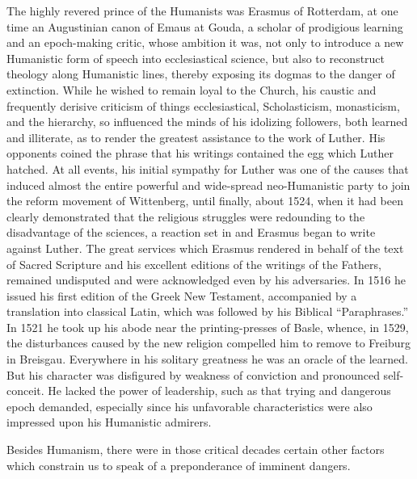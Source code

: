 The highly revered prince of the Humanists was Erasmus of
Rotterdam, at one time an Augustinian canon of Emaus at Gouda,
a scholar of prodigious learning and an epoch-making critic, whose
ambition it was, not only to introduce a new Humanistic form of
speech into ecclesiastical science, but also to reconstruct theology
along Humanistic lines, thereby exposing its dogmas to the danger
of extinction. While he wished to remain loyal to the Church, his
caustic and frequently derisive criticism of things ecclesiastical, Scholasticism,
monasticism, and the hierarchy, so influenced the minds
of his idolizing followers, both learned and illiterate, as to render
the greatest assistance to the work of Luther. His opponents coined
the phrase that his writings contained the egg which Luther hatched.
At all events, his initial sympathy for Luther was one of the causes
that induced almost the entire powerful and wide-spread neo-Humanistic
party to join the reform movement of Wittenberg, until
finally, about 1524, when it had been clearly demonstrated that the
religious struggles were redounding to the disadvantage of the sciences,
a reaction set in and Erasmus began to write against Luther.
The great services which Erasmus rendered in behalf of the text
of Sacred Scripture and his excellent editions of the writings of the
Fathers, remained undisputed and were acknowledged even by his
adversaries. In 1516 he issued his first edition of the Greek New
Testament, accompanied by a translation into classical Latin, which
was followed by his Biblical “Paraphrases.” In 1521 he took up his
abode near the printing-presses of Basle, whence, in 1529, the disturbances
caused by the new religion compelled him to remove to
Freiburg in Breisgau. Everywhere in his solitary greatness he was
an oracle of the learned. But his character was disfigured by weakness
of conviction and pronounced self-conceit. He lacked the power
of leadership, such as that trying and dangerous epoch demanded,
especially since his unfavorable characteristics were also impressed
upon his Humanistic admirers.

Besides Humanism, there were in those critical decades certain
other factors which constrain us to speak of a preponderance of
imminent dangers.

